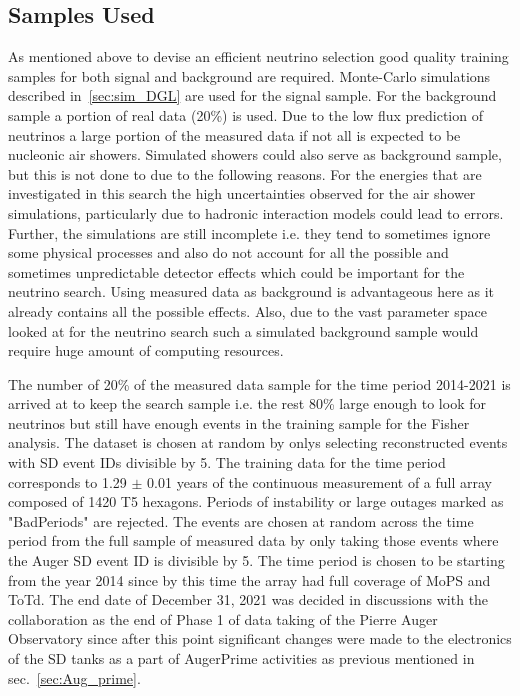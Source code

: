 \subsection{Samples Used}
\label{subsec:nu_sel_samp}

As mentioned above to devise an efficient neutrino selection good quality training samples for both signal and background are required. Monte-Carlo simulations described in~\ref{sec:sim_DGL} are used for the signal sample. For the background sample a portion of real data (20\%) is used. Due to the low flux prediction of neutrinos a large portion of the measured data if not all is expected to be nucleonic air showers. Simulated showers could also serve as background sample, but this is not done to due to the following reasons. For the energies that are investigated in this search the high uncertainties observed for the air shower simulations, particularly due to hadronic interaction models could lead to errors. Further, the simulations are still incomplete i.e. they tend to sometimes ignore some physical processes and also do not account for all the possible and sometimes unpredictable detector effects which could be important for the neutrino search. Using measured data as background is advantageous here as it already contains all the possible effects. Also, due to the vast parameter space looked at for the neutrino search such a simulated background sample would require huge amount of computing resources. 

The number of 20\% of the measured data sample for the time period 2014-2021 is arrived at to keep the search sample i.e. the rest 80\% large enough to look for neutrinos but still have enough events in the training sample for the Fisher analysis. The dataset is chosen at random by onlys selecting reconstructed events with SD event IDs divisible by 5. The training data for the time period corresponds to 1.29 $\pm$ 0.01 years of the continuous measurement of a full array composed of 1420 T5 hexagons. Periods of instability or large outages marked as "BadPeriods" are rejected. The events are chosen at random across the time period from the full sample of measured data by only taking those events where the Auger SD event ID is divisible by 5. The time period is chosen to be starting from the year 2014 since by this time the array had full coverage of MoPS and ToTd. The end date of December 31, 2021 was decided in discussions with the collaboration as the end of Phase 1 of data taking of the Pierre Auger Observatory since after this point significant changes were made to the electronics of the SD tanks as a part of AugerPrime activities as previous mentioned in sec.~\ref{sec:Aug_prime}.

